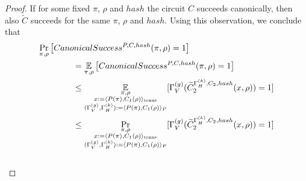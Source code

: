 %
\begin{proof}
If for some fixed $\pi$, $\rho$ and $hash$ the circuit $C$ succeeds canonically, then also $\widetilde{C}$ succeeds for the same $\pi$, $\rho$ and $hash$.
Using this observation, we conclude that
\begin{align*}
  &\underset{\pi, \rho}{\Pr}\left[CanonicalSuccess^{P, C, hash}(\pi, \rho) = 1\right] \\
  &\mbox\qquad\qquad = \underset{\pi, \rho}{\mathbb{E}}\left[CanonicalSuccess^{P, C, hash}(\pi, \rho) = 1 \right] \\
  &\mbox\qquad\qquad \leq
    \underset{\substack{\pi, \rho \\
        x := \langle P(\pi), C_1(\rho) \rangle_{\text{trans}} \\
        (\Gamma_V^{(g)}, \Gamma_H^{(k)}) := \langle P(\pi), C_1(\rho) \rangle_{P}
      }}
    {\mathbb{E}}[\Gamma_V^{(g)}(\widetilde{C}_2^{\Gamma_H^{(k)}, C_2, hash}(x, \rho)) = 1] \\
  &\mbox\qquad\qquad \leq
    \underset{\substack{\pi, \rho \\
        x := \langle P(\pi), C_1(\rho) \rangle_{\text{trans}} \\
        (\Gamma_V^{(g)}, \Gamma_H^{(k)}) := \langle P(\pi), C_1(\rho) \rangle_{P}
      }}
    {\Pr}[\Gamma_V^{(g)}(\widetilde{C}_2^{\Gamma_H^{(k)}, C_2, hash}(x, \rho)) = 1]
\end{align*}
\\\text{  }
\end{proof}
%
